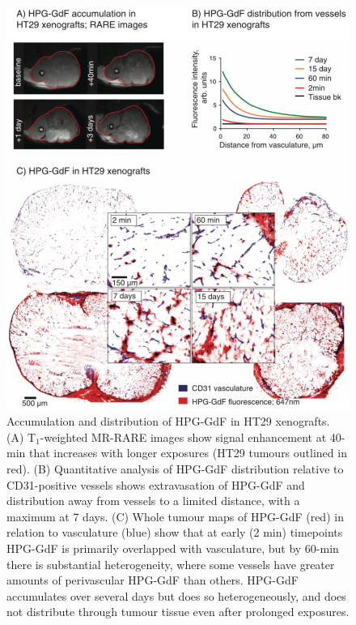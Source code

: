 \begin{figure}[htbp]
 \begin{center}
 \includegraphics[width=\textwidth]{hpg/hpg-paper1-images/hpg_fig3-hpgdistribution.png}
 \caption{Accumulation and distribution of \acs{HPG-GdF} in HT29 xenografts. (A) T$_1$-weighted MR-RARE images show signal enhancement at 40-min that increases with longer exposures (HT29 tumours outlined in red). (B) Quantitative analysis of \acs{HPG-GdF} distribution relative to \acs{CD31}-positive vessels shows extravasation of \acs{HPG-GdF} and distribution away from vessels to a limited distance, with a maximum at 7 days. (C) Whole tumour maps of \acs{HPG-GdF} (red) in relation to vasculature (blue) show that at early (2 min) timepoints \acs{HPG-GdF} is primarily overlapped with vasculature, but by 60-min there is substantial heterogeneity, where some vessels have greater amounts of perivascular \acs{HPG-GdF} than others. \acs{HPG-GdF} accumulates over several days but does so heterogeneously, and does not distribute through tumour tissue even after prolonged exposures.}
 \label{hpgpaper1:fig3}
 \end{center}
\end{figure}

